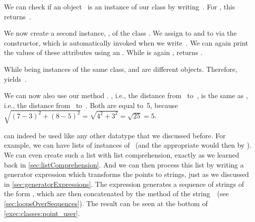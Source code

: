 We can check if an object~ is an instance of our class  by writing~.
For , this returns~.

We now create a second instance, , of the class .
We assign  to  and  to  via the  constructor, which is automatically invoked when we write~.
We can again print the values of these attributes using an .
While  is again ,  returns .

While being instances of the same class,  and  are different objects.
Therefore,  yields~.%
%
\begin{sloppypar}%
We can now also use our method .
, i.e., the distance from~ to~, is the same as , i.e., the distance from~ to~.
Both are equal to~5, because~$\sqrt{(7 - 3)^2+ (8 - 5)^2}=\sqrt{4^2 + 3^2}=\sqrt{25}=5$.%
\end{sloppypar}%
%
 can indeed be used like any other datatype that we discussed before.
For example, we can have lists of instances of ~(and the appropriate  would then by ).
We can even create such a list with list comprehension, exactly as we learned back in \cref{sec:listComprehension}.
And we can then process this list by writing a generator expression which transforms the points to strings, just as we discussed in \cref{sec:generatorExpressions}.
The expression generates a sequence of strings of the form , which are then concatenated by the  method of the string~~(see \cref{sec:loopsOverSequences}).
The result can be seen at the bottom of \cref{exec:classes:point_user}.

